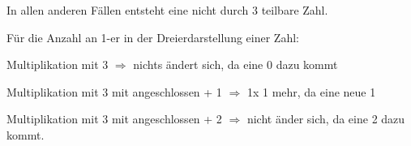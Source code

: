 \documentclass[11pt]{article}
\begin{document}
    In allen anderen Fällen entsteht eine nicht durch 3 teilbare Zahl.


    \bigskip

    Für die Anzahl an 1-er in der Dreierdarstellung einer Zahl:

    Multiplikation mit 3 $\Rightarrow$ nichts ändert sich, da eine 0 dazu kommt

    Multiplikation mit 3 mit angeschlossen + 1 $\Rightarrow$ 1x 1 mehr, da eine neue 1

    Multiplikation mit 3 mit angeschlossen + 2 $\Rightarrow$ nicht änder sich, da eine 2 dazu kommt.
\end{document}
